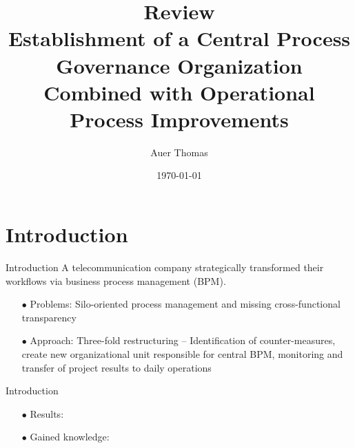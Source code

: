 \documentclass{beamer}
\title{\textbf{Review}\\Establishment of a Central Process Governance Organization Combined with Operational Process Improvements}
\author{Auer Thomas}
\date{\today}
\institute{University of Klagenfurt}
\begin{document}
\frame{\titlepage}

\begin{frame}
    \tableofcontents
\end{frame}

\section{Introduction}
\begin{frame}{Introduction}
A telecommunication company strategically transformed their workflows via business process management (BPM).
    \begin{enumerate}
        \item[$\bullet$] Problems: Silo-oriented process management and missing cross-functional transparency
        \item[$\bullet$] Approach: Three-fold restructuring -- Identification of counter-measures, create new organizational unit responsible for central BPM, monitoring and transfer of project results to daily operations
    \end{enumerate}
\end{frame}

\begin{frame}{Introduction}
        \begin{enumerate}
            \item[$\bullet$] Results: 
            \item[$\bullet$] Gained knowledge: 
        \end{enumerate}
    \end{frame}
\end{document}
